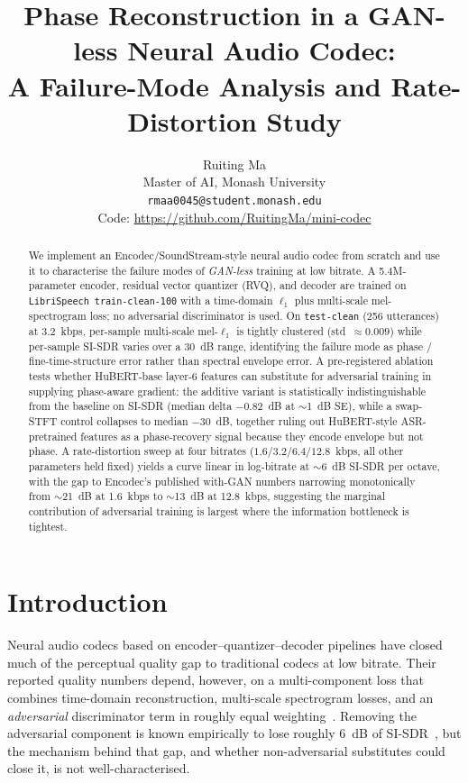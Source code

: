 \documentclass[11pt]{article}
\title{
  Phase Reconstruction in a GAN-less Neural Audio Codec:\\
  A Failure-Mode Analysis and Rate-Distortion Study
}
\author{
  Ruiting Ma\\
  Master of AI, Monash University\\
  \texttt{rmaa0045@student.monash.edu}\\[0.4em]
  \small{Code: \url{https://github.com/RuitingMa/mini-codec}}
}
\date{}
\begin{document}
\maketitle

\begin{abstract}
\noindent
We implement an Encodec/SoundStream-style neural audio codec from
scratch and use it to characterise the failure modes of \emph{GAN-less}
training at low bitrate.
A 5.4M-parameter encoder, residual vector quantizer (RVQ), and decoder
are trained on \texttt{LibriSpeech train-clean-100} with a time-domain
$\ell_1$ plus multi-scale mel-spectrogram loss; no adversarial
discriminator is used.
On \texttt{test-clean} (256 utterances) at 3.2~kbps, per-sample
multi-scale mel-$\ell_1$ is tightly clustered (std~$\approx 0.009$)
while per-sample SI-SDR varies over a 30~dB range, identifying the
failure mode as phase / fine-time-structure error rather than
spectral envelope error.
A pre-registered ablation tests whether HuBERT-base layer-6 features
can substitute for adversarial training in supplying phase-aware
gradient: the additive variant is statistically indistinguishable from
the baseline on SI-SDR (median delta $-0.82$~dB at $\sim$1~dB SE),
while a swap-STFT control collapses to median $-30$~dB, together
ruling out HuBERT-style ASR-pretrained features as a phase-recovery
signal because they encode envelope but not phase.
A rate-distortion sweep at four bitrates ($1.6/3.2/6.4/12.8$~kbps,
all other parameters held fixed) yields a curve linear in
log-bitrate at $\sim$6~dB SI-SDR per octave, with the gap to
Encodec's published with-GAN numbers narrowing monotonically from
$\sim$21~dB at 1.6~kbps to $\sim$13~dB at 12.8~kbps, suggesting
the marginal contribution of adversarial training is largest where
the information bottleneck is tightest.
\end{abstract}

\section{Introduction}
\label{sec:intro}

Neural audio codecs based on encoder--quantizer--decoder pipelines
\citep{defossez2022high,zeghidour2021soundstream,kumar2023high} have
closed much of the perceptual quality gap to traditional codecs at
low bitrate. Their reported quality numbers depend, however, on a
multi-component loss that combines time-domain reconstruction,
multi-scale spectrogram losses, and an \emph{adversarial}
discriminator term in roughly equal weighting~\citep{defossez2022high}.
Removing the adversarial component is known empirically to lose
roughly $6$~dB of SI-SDR~\citep[\S3.5]{defossez2022high}, but the
mechanism behind that gap, and whether non-adversarial substitutes
could close it, is not well-characterised.
\end{document}
